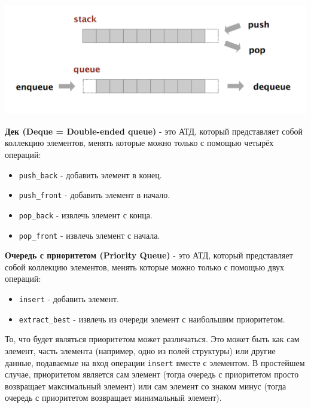 \documentclass{article}
\begin{document}
\begin{center}
\includegraphics[scale=0.31]{../images/stack_queue.png}
\end{center}

\textbf{Дек (Deque = Double-ended queue)} - это АТД, который представляет собой коллекцию элементов, менять которые можно только с помощью четырёх операций:
\begin{itemize}
\item \texttt{push\_back} - добавить элемент в конец.
\item \texttt{push\_front} - добавить элемент в начало.
\item \texttt{pop\_back} - извлечь элемент с конца.
\item \texttt{pop\_front} - извлечь элемент с начала.\\
\end{itemize}

\textbf{Очередь с приоритетом (Priority Queue)} - это АТД, который представляет собой коллекцию элементов, менять которые можно только с помощью двух операций:
\begin{itemize}
\item \texttt{insert} - добавить элемент.
\item \texttt{extract\_best} - извлечь из очереди элемент с наибольшим приоритетом. 
\end{itemize}
То, что будет являться приоритетом может различаться. Это может быть как сам элемент, часть элемента (например, одно из полей структуры) или другие данные, подаваемые на вход операции \texttt{insert} вместе с элементом. В простейшем случае, приоритетом является сам элемент (тогда очередь с приоритетом просто возвращает максимальный элемент) или сам элемент со знаком минус (тогда очередь с приоритетом возвращает минимальный элемент).


\newpage
\end{document}
